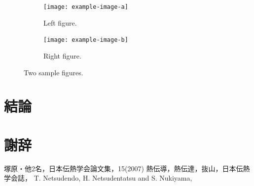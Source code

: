 \documentclass[
    paper=a4paper,      %
    article,            %
    fleqn,              %
    fontsize=10pt,      %
    jafontsize=10pt,    %
    head_space=20mm,    %
    foot_space=25mm,    %
    gutter=20mm,        %
    fore-edge=20mm      %
    ]{jlreq}            %
\begin{document}
\begin{figure}[tp]
  \centering
  \begin{subfigure}{0.45\columnwidth}
      \centering
      \texttt{[image: example-image-a]}
      \caption{Left figure.}
      \label{fig:two_figures_a}
  \end{subfigure}
  \hfill %
  \begin{subfigure}{0.45\columnwidth}
      \centering
      \texttt{[image: example-image-b]}
      \caption{Right figure.}
      \label{fig:two_figures_b}
  \end{subfigure}
  \caption{Two sample figures.}
  \label{fig:two_figures}
\end{figure}

\lipsum[1-4]

\section{結論}


\section*{謝辞}

\lipsum[1-2]

\begin{thebibliography}{99}
   塚原・他2名，日本伝熱学会論文集，15(2007)
   熱伝導，熱伝達，抜山，日本伝熱学会誌，
   T. Netsudendo, H. Netsudentatsu and S. Nukiyama, 
\end{thebibliography}
\end{document}
